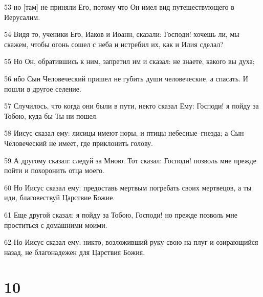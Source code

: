 \par 53 но [там] не приняли Его, потому что Он имел вид путешествующего в Иерусалим.
\par 54 Видя то, ученики Его, Иаков и Иоанн, сказали: Господи! хочешь ли, мы скажем, чтобы огонь сошел с неба и истребил их, как и Илия сделал?
\par 55 Но Он, обратившись к ним, запретил им и сказал: не знаете, какого вы духа;
\par 56 ибо Сын Человеческий пришел не губить души человеческие, а спасать. И пошли в другое селение.
\par 57 Случилось, что когда они были в пути, некто сказал Ему: Господи! я пойду за Тобою, куда бы Ты ни пошел.
\par 58 Иисус сказал ему: лисицы имеют норы, и птицы небесные--гнезда; а Сын Человеческий не имеет, где приклонить голову.
\par 59 А другому сказал: следуй за Мною. Тот сказал: Господи! позволь мне прежде пойти и похоронить отца моего.
\par 60 Но Иисус сказал ему: предоставь мертвым погребать своих мертвецов, а ты иди, благовествуй Царствие Божие.
\par 61 Еще другой сказал: я пойду за Тобою, Господи! но прежде позволь мне проститься с домашними моими.
\par 62 Но Иисус сказал ему: никто, возложивший руку свою на плуг и озирающийся назад, не благонадежен для Царствия Божия.

\chapter{10}

